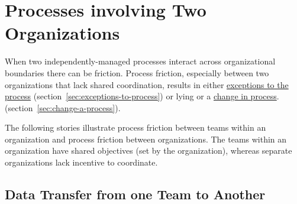 \section{Processes involving Two Organizations\label{sec:processes-two-organizations}}

When two independently-managed processes interact across organizational boundaries there can be friction. Process friction, especially between two  organizations that lack shared coordination, results in either \hyperref[sec:exceptions-to-process]{exceptions to the process} 
\ifsectionref
(section~\ref{sec:exceptions-to-process}) 
\fi
or lying or a \hyperref[sec:change-a-process]{change in process}.
\ifsectionref
(section~\ref{sec:change-a-process}). 
\fi

The following stories illustrate process friction between teams within an organization and process friction between organizations. The teams within an organization have shared objectives (set by the organization), whereas separate organizations lack incentive to coordinate. 

\subsection*{Data Transfer from one Team to Another}

